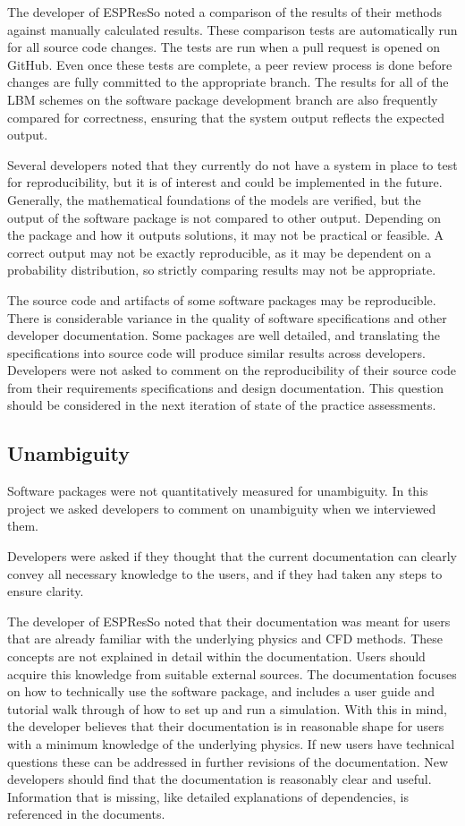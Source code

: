\documentclass[final, 3p, times, authoryear]{elsarticle}
\begin{document}
The developer of ESPResSo noted a comparison of the results of their methods
against manually calculated results. These comparison tests are automatically
run for all source code changes. The tests are run when a pull request is opened
on GitHub. Even once these tests are complete, a peer review process is done
before changes are fully committed to the appropriate branch. The results for
all of the LBM schemes on the software package development branch are also
frequently compared for correctness, ensuring that the system output reflects
the expected output.  

Several developers noted that they currently do not have a system in place to
test for reproducibility, but it is of interest and could be implemented in the
future. Generally, the mathematical foundations of the models are verified, but
the output of the software package is not compared to other output. Depending on
the package and how it outputs solutions, it may not be practical or feasible. A
correct output may not be exactly reproducible, as it may be dependent on a
probability distribution, so strictly comparing results may not be appropriate. 

The source code and artifacts of some software packages may be reproducible.
There is considerable variance in the quality of software specifications and
other developer documentation. Some packages are well detailed, and translating
the specifications into source code will produce similar results across
developers. Developers were not asked to comment on the reproducibility of their
source code from their requirements specifications and design documentation.
This question should be considered in the next iteration of state of the
practice assessments. 

\subsection{Unambiguity}

Software packages were not quantitatively measured for unambiguity. In this
project we asked developers to comment on unambiguity when we interviewed them.

Developers were asked if they thought that the current documentation can clearly
convey all necessary knowledge to the users, and if they had taken any steps to
ensure clarity. 

The developer of ESPResSo noted that their documentation was meant for users
that are already familiar with the underlying physics and CFD methods. These
concepts are not explained in detail within the documentation. Users should
acquire this knowledge from suitable external sources. The documentation focuses
on how to technically use the software package, and includes a user guide and
tutorial walk through of how to set up and run a simulation. With this in mind,
the developer believes that their documentation is in reasonable shape for users
with a minimum knowledge of the underlying physics. If new users have technical
questions these can be addressed in further revisions of the documentation. New
developers should find that the documentation is reasonably clear and useful.
Information that is missing, like detailed explanations of dependencies, is
referenced in the documents. 
\end{document}
